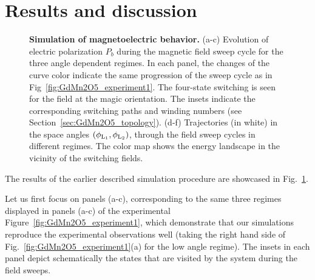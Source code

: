 \section{Results and discussion}
\begin{figure}
    \caption{\label{fig:GdMn2O5_theory}{\bf Simulation of magnetoelectric behavior.}
    (a-c) Evolution of electric polarization $P_b$ during the magnetic field sweep cycle for the three angle dependent regimes. 
   In each panel, the changes of the curve color indicate the same progression of the sweep cycle as in Fig~\ref{fig:GdMn2O5_experiment1}. The four-state switching is seen for the field at the magic orientation. 
    The insets indicate the corresponding switching paths and winding numbers (see Section~\ref{sec:GdMn2O5_topology}).
    (d-f) Trajectories (in white) in the space angles $(\phi_{\rm L_1},\phi_{\rm L_2})$, through the field sweep cycles in different regimes. The color map shows the energy landscape in the vicinity of the switching fields. 
}
\end{figure}

The results of the earlier described simulation procedure are showcased in Fig.~\ref{fig:GdMn2O5_theory}.

Let us first focus on panels (a-c), corresponding to the same three regimes displayed in panels (a-c) of the experimental Figure~\ref{fig:GdMn2O5_experiment1}, which demonstrate that our simulations reproduce the experimental observations well (taking the right hand side of Fig.~\ref{fig:GdMn2O5_experiment1}(a) for the low angle regime).
The insets in each panel depict schematically the states that are visited by the system during the field sweeps.

